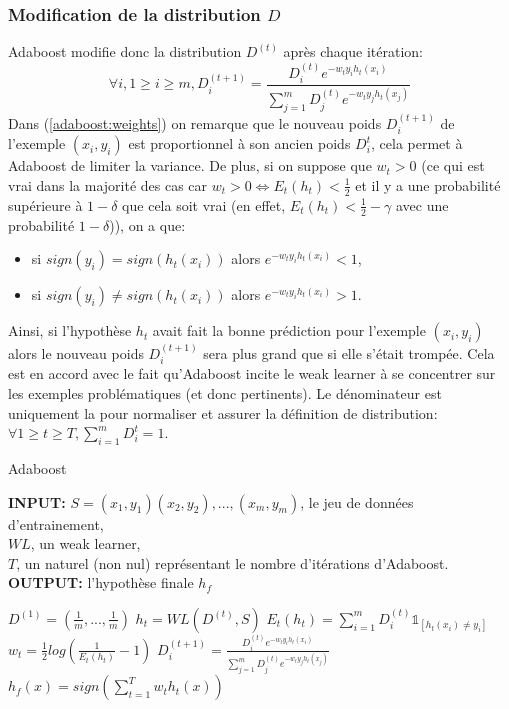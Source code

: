 \documentclass[12pt]{article}
\begin{document}
	\subsubsection{Modification de la distribution $D$}
	\label{adaboost:newdistrib}
	Adaboost modifie donc la distribution $D^{(t)}$ après chaque itération: 
	\begin{equation}
		\label{adaboost:weights}
		\forall i, 1 \geq i \geq m, D^{(t+1)}_i = \frac{D^{(t)}_i e^{-w_t y_i h_t(x_i)}}{\sum_{j=1}^m D^{(t)}_j e^{-w_t y_j h_t(x_j)}} 
	\end{equation}   
	Dans (\ref{adaboost:weights}) on remarque que le nouveau poids $D^{(t+1)}_i$ de l'exemple $(x_i,y_i)$ est proportionnel à son ancien poids $D^{t}_i$, cela permet à Adaboost de limiter la variance. De plus, si on suppose que $w_t > 0$ (ce qui est vrai dans la majorité des cas car $w_t > 0 \Leftrightarrow E_t(h_t) < \frac{1}{2}$ et il y a une probabilité supérieure à $1-\delta$ que cela soit vrai (en effet, $E_t(h_t) < \frac{1}{2} - \gamma$ avec une probabilité $1-\delta$)), on a que:
	\begin{itemize}
		\item si $sign(y_i)=sign(h_t(x_i))$ alors $e^{-w_t y_i h_t(x_i)} < 1$,
		\item si $sign(y_i) \neq sign(h_t(x_i))$ alors $e^{-w_t y_i h_t(x_i)} > 1$. 
	\end{itemize}
	Ainsi, si l'hypothèse $h_t$ avait fait la bonne prédiction pour l'exemple $(x_i,y_i)$ alors le nouveau poids $D^{(t+1)}_i$ sera plus grand que si elle s'était trompée. Cela est en accord avec le fait qu'Adaboost incite le weak learner à se concentrer sur les exemples problématiques (et donc pertinents).
	Le dénominateur est uniquement la pour normaliser et assurer la définition de distribution: $\forall 1 \geq t \geq T, \sum_{i=1}^m D^t_i = 1$.
	
	
	\begin{algorithm}[H]
		\caption{Adaboost}
		\label{adaboost:algo}
		\begin{flushleft}
			\textbf{INPUT:} $S=(x_1,y_1)(x_2,y_2),...,(x_m,y_m)$, le jeu de données d'entrainement,\\
			\hspace{1.5cm} $WL$, un weak learner,\\
			\hspace{1.5cm} $T$, un naturel (non nul) représentant le nombre d'itérations d'Adaboost.\\
			\textbf{OUTPUT:} l'hypothèse finale $h_f$
		\end{flushleft}
		\begin{algorithmic}[1]
			\State $D^{(1)}=(\frac{1}{m},...,\frac{1}{m})$
			\State $h_t = WL(D^{(t)},S)$
			\State $E_t(h_t)= \sum_{i=1}^m D^{(t)}_i \mathbb{1}_{[h_t(x_i) \neq y_i]}$
			\State $w_t = \frac{1}{2} log(\frac{1}{E_t(h_t)} - 1)$
			\State $D^{(t+1)}_i = \frac{D^{(t)}_i e^{-w_t y_i h_t(x_i)}}{\sum_{j=1}^m D^{(t)}_j e^{-w_t y_j h_t(x_j)}}$ 
			\EndFor
			\EndFor
			\State $h_f(x) = sign (\sum_{t=1}^T w_t h_t(x))$
			\State {}
			\EndFunction
		\end{algorithmic}
	\end{algorithm}
	
\end{document}
